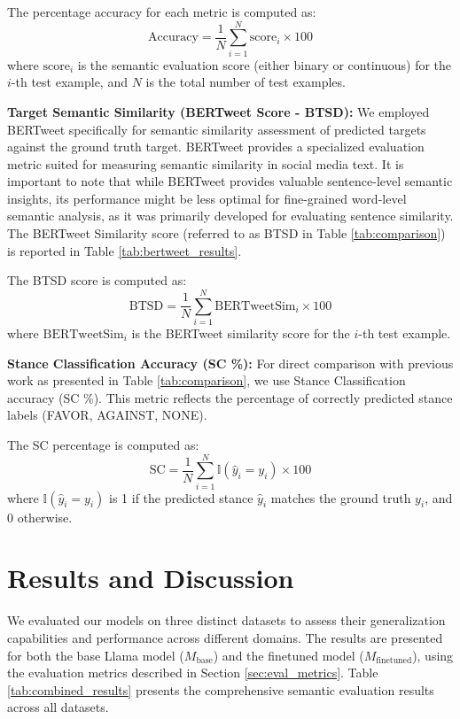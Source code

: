 \documentclass[twocolumn,11pt,letterpaper]{article}
\begin{document}
The percentage accuracy for each metric is computed as:
\[
\text{Accuracy} = \frac{1}{N} \sum_{i=1}^{N} \text{score}_i \times 100
\]
where $\text{score}_i$ is the semantic evaluation score (either binary or continuous) for the $i$-th test example, and $N$ is the total number of test examples.

\textbf{Target Semantic Similarity (BERTweet Score - BTSD):} We employed BERTweet \cite{bertweet} specifically for semantic similarity assessment of predicted targets against the ground truth target. BERTweet provides a specialized evaluation metric suited for measuring semantic similarity in social media text. It is important to note that while BERTweet provides valuable sentence-level semantic insights, its performance might be less optimal for fine-grained word-level semantic analysis, as it was primarily developed for evaluating sentence similarity. The BERTweet Similarity score (referred to as BTSD in Table \ref{tab:comparison}) is reported in Table \ref{tab:bertweet_results}.

The BTSD score is computed as:
\[
\text{BTSD} = \frac{1}{N} \sum_{i=1}^{N} \text{BERTweetSim}_i \times 100
\]
where $\text{BERTweetSim}_i$ is the BERTweet similarity score for the $i$-th test example.

\textbf{Stance Classification Accuracy (SC \%):} For direct comparison with previous work as presented in Table \ref{tab:comparison}, we use Stance Classification accuracy (SC \%). This metric reflects the percentage of correctly predicted stance labels (FAVOR, AGAINST, NONE).

The SC percentage is computed as:
\[
\text{SC} = \frac{1}{N} \sum_{i=1}^{N} \mathbb{I}(\hat{y}_i = y_i) \times 100
\]
where $\mathbb{I}(\hat{y}_i = y_i)$ is 1 if the predicted stance $\hat{y}_i$ matches the ground truth $y_i$, and 0 otherwise.

\section{Results and Discussion}
\label{sec:results}

We evaluated our models on three distinct datasets to assess their generalization capabilities and performance across different domains. The results are presented for both the base Llama model ($M_{\text{base}}$) and the finetuned model ($M_{\text{finetuned}}$), using the evaluation metrics described in Section \ref{sec:eval_metrics}. 
Table \ref{tab:combined_results} presents the comprehensive semantic evaluation results across all datasets.
\end{document}
